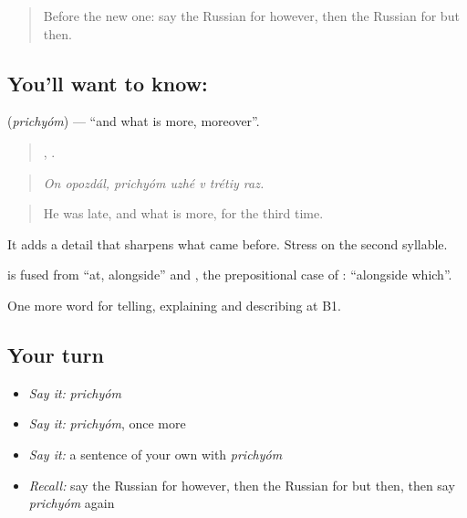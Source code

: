 \label{lesson:RU-C347-prichyom}



\begin{quote}
Before the new one: say the Russian for however, then the Russian for but then.
\end{quote}

\subsection*{You'll want to know: }
\textbf{} (\emph{prichyóm}) — \textquotedblleft{}and what is more, moreover\textquotedblright{}.

\begin{quote}
 ,     .
\end{quote}

\begin{quote}
\emph{On opozdál, prichyóm uzhé v trétiy raz.}
\end{quote}

\begin{quote}
He was late, and what is more, for the third time.
\end{quote}

It adds a detail that sharpens what came before. Stress on the second syllable.

\begin{cousinweb}
\textbf{} is fused from \emph{} \textquotedblleft{}at, alongside\textquotedblright{} and \emph{}, the prepositional case of \emph{}: \textquotedblleft{}alongside which\textquotedblright{}.
\end{cousinweb}

\begin{grammarlens}[title={What you've built}]
One more word for telling, explaining and describing at B1.
\end{grammarlens}

\subsection*{Your turn}
\begin{itemize}
\raggedright
  \item \emph{Say it:} \emph{prichyóm}
  \item \emph{Say it:} \emph{prichyóm}, once more
  \item \emph{Say it:} a sentence of your own with \emph{prichyóm}
  \item \emph{Recall:} say the Russian for however, then the Russian for but then, then say \emph{prichyóm} again
\end{itemize}

